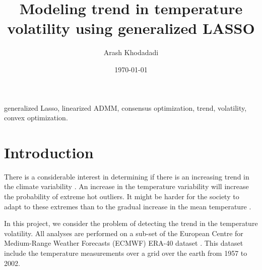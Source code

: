 \documentclass[review]{elsarticle}
\begin{document}
 


\begin{frontmatter}

\title{Modeling trend in temperature volatility using generalized LASSO}

\author{Arash Khodadadi}
\address{Department of Statistics, Indiana University, Bloomington, IN, United States}

\date{\today}

\begin{keyword}
generalized Lasso, linearized ADMM, consensus optimization, trend, volatility, convex optimization.
\end{keyword}

\end{frontmatter}



\section{Introduction}

There is a considerable interest in determining if there is an increasing trend in the climate variability \cite{hansen_perception_2012,huntingford_no_2013}. An increase in the temperature variability will increase the probability of extreme hot outliers. It might be harder for the society to adapt to these extremes than to the gradual increase in the mean temperature \cite{huntingford_no_2013}.

In this project, we consider the problem of detecting the trend in the temperature volatility. All analyses are performed on a sub-set of the European Centre for Medium-Range Weather Forecasts (ECMWF) ERA-40 dataset \cite{uppala_era-40_2005}. This dataset include the temperature measurements over a grid over the earth from 1957 to 2002.
\end{document}
